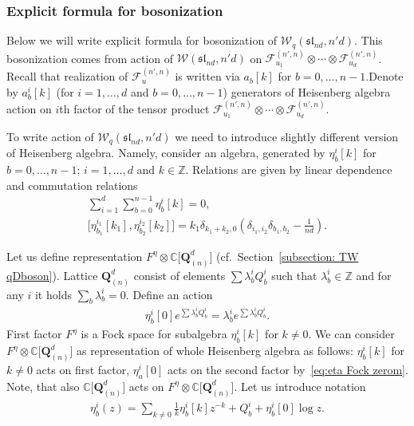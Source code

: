 \documentclass[pdftex]{sigma}
\numberwithin{equation}{section}
\theoremstyle{definition}
\newcommand{\dQ}{\mathbf{Q}^d_{(n)}}
\begin{document}
\subsubsection{Explicit formula for bosonization}
Below we will write explicit formula for bosonization of $\mathcal{W}_q (\mathfrak{sl}_{nd}, n'd)$. This bosonization comes from action of $\mathcal{W}(\mathfrak{sl}_{nd}, n'd)$ on $\mathcal{F}^{(n',n)}_{u_1} \otimes \cdots \otimes \mathcal{F}_{u_d}^{(n',n)}$. Recall that realization of $\mathcal{F}_{u}^{(n',n)}$ is written via $a_b[k]$ for $b=0, \dots, n-1$.Denote by $a_b^i[k]$ (for $i=1, \dots, d$ and $b=0, \dots, n-1$) generators of Heisenberg algebra action on $i$th factor of the tensor product $\mathcal{F}^{(n',n)}_{u_1} \otimes \cdots \otimes \mathcal{F}_{u_d}^{(n',n)}$.

To write action of $\mathcal{W}_q (\mathfrak{sl}_{nd}, n'd)$ we need to introduce slightly different version of Heisenberg algebra. Namely, consider an algebra, generated by $\eta_b^{i}[k]$ for $b=0, \dots, n-1$; $i=1, \dots, d$ and $k \in \mathbb{Z}$. Relations are given by linear dependence and commutation relations
\begin{gather*}
\sum_{i=1}^{d} \sum_{b=0}^{n-1} \eta_b^{i}[k]=0, \\
\big[\eta_{b_1}^{i_1}[k_1], \eta_{b_2}^{i_2}[k_2] \big] = k_1 \delta_{k_1+k_2,0} \left( \delta_{i_1, i_2} \delta_{b_1, b_2}-\frac{1}{nd} \right).
\end{gather*}

Let us define representation $F^{\eta} \otimes \mathbb{C} \big[ \dQ \big]$ (cf.\ Section~\ref{subsection: TW qDboson}). Lattice $\dQ$ consist of elements $\sum \lambda^i_b Q^i_b$ such that $\lambda^i_b \in \mathbb{Z}$ and for any $i$ it holds $\sum_b \lambda^i_b =0$. Define an action
\begin{gather}
\eta_b^i[0] e^{\sum \lambda_b^i Q^i_b} = \lambda_b^{i} e^{\sum \lambda^i_b Q_b^i} . \label{eq:eta Fock zerom}
\end{gather}
First factor $F^{\eta}$ is a Fock space for subalgebra $\eta_b^i[k]$ for $k \neq 0$. We can consider $F^{\eta} \otimes \mathbb{C} \big[ \dQ \big]$ as representation of whole Heisenberg algebra as follows: $\eta_b^i[k]$ for $k \neq 0$ acts on first factor, $\eta_a^i[0]$ acts on the second factor by~\eqref{eq:eta Fock zerom}. Note, that also $\mathbb{C} \big[ \dQ \big]$ acts on $F^{\eta} \otimes \mathbb{C} \big[ \dQ \big]$. Let us introduce notation
\begin{gather*}
\eta_{b}^i(z) = \sum_{k \neq 0} \frac{1}{k} \eta_b^i[k] z^{-k} +Q^i_b + \eta_b^i[0] \log z.
\end{gather*}
\end{document}
